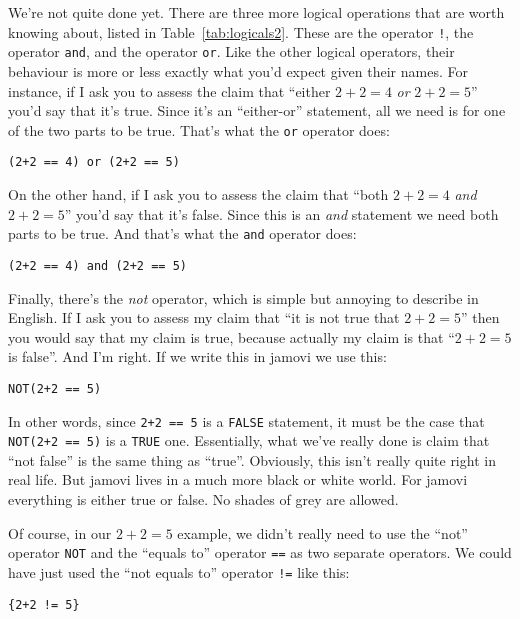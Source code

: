 We're not quite done yet. There are three more logical operations that are worth knowing about, listed in Table~\ref{tab:logicals2}. These are the  operator \verb#!#, the  operator \verb#and#, and the  operator \verb#or#. Like the other logical operators, their behaviour is more or less exactly what you'd expect given their names. For instance, if I ask you to assess the claim that ``either $2+2 = 4$ {\it or} $2+2 = 5$'' you'd say that it's true. Since it's an ``either-or'' statement, all we need is for one of the two parts to be true. That's what the \texttt{or} operator does: 
\begin{verbatim}
(2+2 == 4) or (2+2 == 5) 
\end{verbatim}
On the other hand, if I ask you to assess the claim that ``both $2+2 = 4$ {\it and} $2+2 = 5$'' you'd say that it's false. Since this is an {\it and} statement we need both parts to be true. And that's what the \verb#and# operator does:
\begin{verbatim}
(2+2 == 4) and (2+2 == 5)
\end{verbatim}
Finally, there's the {\it not} operator, which is simple but annoying to describe in English. If I ask you to assess my claim that ``it is not true that $2+2 = 5$'' then you would say that my claim is true,  because actually my claim is that ``$2+2 = 5$ is false''. And I'm right. If we write this in jamovi we use this: 
\begin{verbatim}
NOT(2+2 == 5)
\end{verbatim}
In other words, since \texttt{2+2 == 5} is a \texttt{FALSE} statement, it must be the case that \texttt{NOT(2+2 == 5)} is a \texttt{TRUE} one. Essentially, what we've really done is claim that ``not false'' is the same thing as ``true''. Obviously, this isn't really quite right in real life. But jamovi lives in a much more black or white world. For jamovi everything is either true or false. No shades of grey are allowed. 

Of course, in our $2+2 = 5$ example, we didn't really need to use the ``not'' operator \texttt{NOT} and the ``equals to'' operator \texttt{==} as two separate operators. We could have just used the ``not equals to'' operator \texttt{!=} like this:
\begin{verbatim}
{2+2 != 5}
\end{verbatim}

